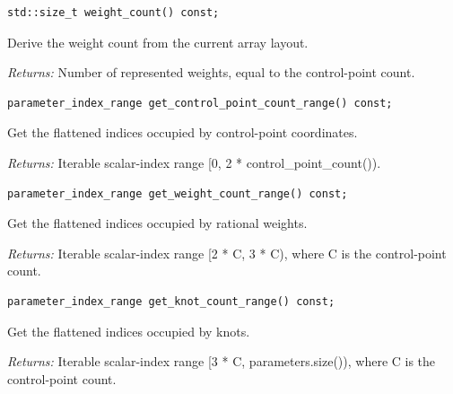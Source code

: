 \par\noindent\begin{minipage}{\linewidth}
\begin{lstlisting}[style=apireference]
std::size_t weight_count() const;
\end{lstlisting}
{\footnotesize Derive the weight count from the current array layout.\par}
{\footnotesize\textit{Returns:} Number of represented weights, equal to the control-point count.\par}
\end{minipage}\par\vspace{1pt}
\par\noindent\begin{minipage}{\linewidth}
\begin{lstlisting}[style=apireference]
parameter_index_range get_control_point_count_range() const;
\end{lstlisting}
{\footnotesize Get the flattened indices occupied by control-point coordinates.\par}
{\footnotesize\textit{Returns:} Iterable scalar-index range [0, 2 * control\_point\_count()).\par}
\end{minipage}\par\vspace{1pt}
\par\noindent\begin{minipage}{\linewidth}
\begin{lstlisting}[style=apireference]
parameter_index_range get_weight_count_range() const;
\end{lstlisting}
{\footnotesize Get the flattened indices occupied by rational weights.\par}
{\footnotesize\textit{Returns:} Iterable scalar-index range [2 * C, 3 * C), where C is the control-point count.\par}
\end{minipage}\par\vspace{1pt}
\par\noindent\begin{minipage}{\linewidth}
\begin{lstlisting}[style=apireference]
parameter_index_range get_knot_count_range() const;
\end{lstlisting}
{\footnotesize Get the flattened indices occupied by knots.\par}
{\footnotesize\textit{Returns:} Iterable scalar-index range [3 * C, parameters.size()), where C is the control-point count.\par}
\end{minipage}\par\vspace{1pt}
